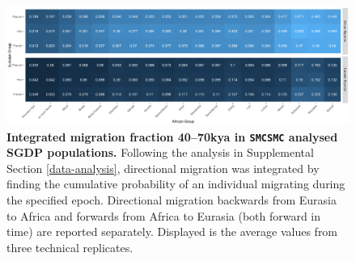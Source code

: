 \documentclass{article}
\begin{document}
\begin{figure}
	\centering
	\includegraphics[width=\textwidth]{plot/integrated_sgdp.pdf}
	\caption{{\bf Integrated migration fraction 40--70kya in {\tt SMCSMC} analysed SGDP populations.} Following the analysis in Supplemental Section \ref{data-analysis}, directional migration was integrated by finding the cumulative probability of an individual migrating during the specified epoch. Directional migration backwards from Eurasia to Africa and forwards from Africa to Eurasia (both forward in time) are reported separately. Displayed is the average values from three technical replicates.}
	\label{sgdp_heatmap}
\end{figure}
\end{document}
